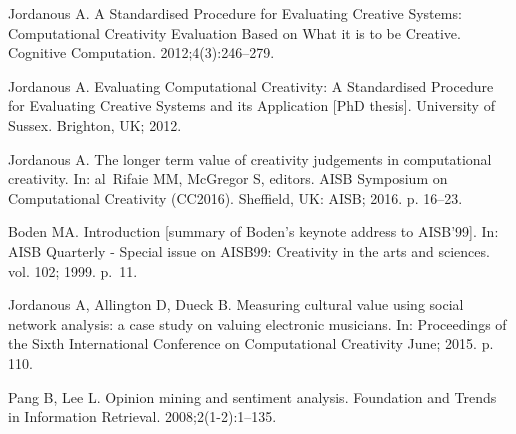 \documentclass[10pt,letterpaper]{article}
\begin{document}
\begin{thebibliography}{10}
Jordanous A.
\newblock A Standardised Procedure for Evaluating Creative Systems:
  Computational Creativity Evaluation Based on What it is to be Creative.
\newblock Cognitive Computation. 2012;4(3):246--279.

Jordanous A.
\newblock Evaluating Computational Creativity: A Standardised Procedure for
  Evaluating Creative Systems and its Application [PhD thesis].
\newblock University of Sussex. Brighton, UK; 2012.

Jordanous A.
\newblock The longer term value of creativity judgements in computational
  creativity.
\newblock In: al~Rifaie MM, McGregor S, editors. {AISB} Symposium on
  Computational Creativity (CC2016). Sheffield, UK: AISB; 2016. p. 16--23.

Boden MA.
\newblock Introduction [summary of {B}oden's keynote address to {AISB}'99].
\newblock In: AISB Quarterly - Special issue on AISB99: Creativity in the arts
  and sciences. vol. 102; 1999. p.~11.

Jordanous A, Allington D, Dueck B.
\newblock Measuring cultural value using social network analysis: a case study
  on valuing electronic musicians.
\newblock In: Proceedings of the Sixth International Conference on
  Computational Creativity June; 2015. p. 110.

Pang B, Lee L.
\newblock Opinion mining and sentiment analysis.
\newblock Foundation and Trends in Information Retrieval. 2008;2(1-2):1--135.

\end{thebibliography}


%


%
%
\end{document}
